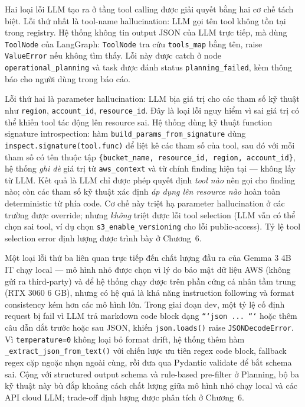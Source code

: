 Hai loại lỗi LLM tạo ra ở tầng tool calling được giải quyết bằng hai cơ chế tách biệt. Lỗi thứ nhất là tool-name hallucination: LLM gọi tên tool không tồn tại trong registry. Hệ thống không tin output JSON của LLM trực tiếp, mà dùng \texttt{ToolNode} của LangGraph: \texttt{ToolNode} tra cứu \texttt{tools\_map} bằng tên, raise \texttt{ValueError} nếu không tìm thấy. Lỗi này được catch ở node \texttt{operational\_planning} và task được đánh status \texttt{planning\_failed}, kèm thông báo cho người dùng trong báo cáo.

Lỗi thứ hai là parameter hallucination: LLM bịa giá trị cho các tham số kỹ thuật như \texttt{region}, \texttt{account\_id}, \texttt{resource\_id}. Đây là loại lỗi nguy hiểm vì sai giá trị có thể khiến tool tác động lên resource sai. Hệ thống dùng kỹ thuật function signature introspection: hàm \texttt{build\_params\_from\_signature} dùng \texttt{inspect.signature(tool.func)} để liệt kê các tham số của tool, sau đó với mỗi tham số có tên thuộc tập \texttt{\{bucket\_name, resource\_id, region, account\_id\}}, hệ thống \emph{ghi đè} giá trị từ \texttt{aws\_context} và từ chính finding hiện tại — không lấy từ LLM. Kết quả là LLM chỉ được phép quyết định \emph{tool nào} nên gọi cho finding nào; còn các tham số kỹ thuật xác định \emph{áp dụng lên resource nào} hoàn toàn deterministic từ phía code. Cơ chế này triệt hạ parameter hallucination ở các trường được override; nhưng \emph{không} triệt được lỗi tool selection (LLM vẫn có thể chọn sai tool, ví dụ chọn \texttt{s3\_enable\_versioning} cho lỗi public-access). Tỷ lệ tool selection error định lượng được trình bày ở Chương~6.

Một loại lỗi thứ ba liên quan trực tiếp đến chất lượng đầu ra của Gemma 3 4B IT chạy local — mô hình nhỏ được chọn vì lý do bảo mật dữ liệu AWS (không gửi ra third-party) và để hệ thống chạy được trên phần cứng cá nhân tầm trung (RTX 3060 6 GB), nhưng có hệ quả là khả năng instruction following và format consistency kém hơn các mô hình lớn. Trong giai đoạn dev, một tỷ lệ cố định request bị fail vì LLM trả markdown code block dạng \texttt{```json ... ```} hoặc thêm câu dẫn dắt trước hoặc sau JSON, khiến \texttt{json.loads()} raise \texttt{JSONDecodeError}. Vì \texttt{temperature=0} không loại bỏ format drift, hệ thống thêm hàm \texttt{\_extract\_json\_from\_text()} với chiến lược ưu tiên regex code block, fallback regex cặp ngoặc nhọn ngoài cùng, rồi đưa qua Pydantic validate để bắt schema sai. Cộng với structured output schema và rule-based pre-filter ở Planning, bộ ba kỹ thuật này bù đắp khoảng cách chất lượng giữa mô hình nhỏ chạy local và các API cloud LLM; trade-off định lượng được phân tích ở Chương~6.


